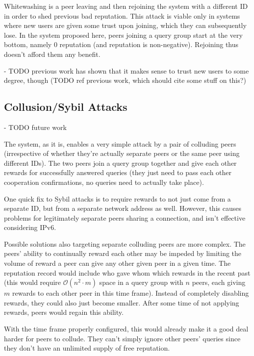 Whitewashing is a peer leaving and then rejoining the system with a different ID
in order to shed previous bad reputation. This attack is viable only in systems
where new users are given some trust upon joining, which they can subsequently
lose. In the system proposed here, peers joining a query group start at the very
bottom, namely 0 reputation (and reputation is non-negative). Rejoining thus
doesn't afford them any benefit.

- TODO previous work has shown that it makes sense to trust new users to some
  degree, though
(TODO ref previous work, which should cite some stuff on this?)

\subsection{Collusion/Sybil Attacks}
\label{sec:desc_collusion_sybil_attacks}
- TODO future work

The system, as it is, enables a very simple attack by a pair of colluding peers
(irrespective of whether they're actually separate peers or the same peer using
different IDs). The two peers join a query group together and give each other
rewards for successfully answered queries (they just need to pass each other
cooperation confirmations, no queries need to actually take place).

One quick fix to Sybil attacks is to require rewards to not just come from a
separate ID, but from a separate network address as well. However, this causes
problems for legitimately separate peers sharing a connection, and isn't
effective considering IPv6.

Possible solutions also targeting separate colluding peers are more complex. The
peers' ability to continually reward each other may be impeded by limiting the
volume of reward a peer can give any other given peer in a given time. The
reputation record would include who gave whom which rewards in the recent past
(this would require $\mathcal{O}(n^2 \cdot m)$ space in a query group with $n$
peers, each giving $m$ rewards to each other peer in this time frame). Instead
of completely disabling rewards, they could also just become smaller. After some
time of not applying rewards, peers would regain this ability.

With the time frame properly configured, this would already make it a good deal
harder for peers to collude. They can't simply ignore other peers' queries since
they don't have an unlimited supply of free reputation.

